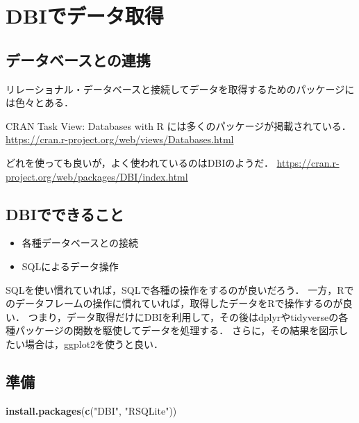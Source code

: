 \documentclass[
]{article}
\newenvironment{Shaded}{\begin{snugshade}}{\end{snugshade}}
\newcommand{\FunctionTok}[1]{\textcolor[rgb]{0.13,0.29,0.53}{\textbf{#1}}}
\newcommand{\NormalTok}[1]{#1}
\newcommand{\StringTok}[1]{\textcolor[rgb]{0.31,0.60,0.02}{#1}}
\providecommand{\tightlist}{%
  \setlength{\itemsep}{0pt}\setlength{\parskip}{0pt}}
\begin{document}
\hypertarget{dbi}{%
\section{DBIでデータ取得}\label{dbi}}

\hypertarget{ux30c7ux30fcux30bfux30d9ux30fcux30b9ux3068ux306eux9023ux643a}{%
\subsection{データベースとの連携}\label{ux30c7ux30fcux30bfux30d9ux30fcux30b9ux3068ux306eux9023ux643a}}

リレーショナル・データベースと接続してデータを取得するためのパッケージには色々とある．

CRAN Task View: Databases with R には多くのパッケージが掲載されている．
\url{https://cran.r-project.org/web/views/Databases.html}

どれを使っても良いが，よく使われているのはDBIのようだ．
\url{https://cran.r-project.org/web/packages/DBI/index.html}

\hypertarget{dbiux3067ux3067ux304dux308bux3053ux3068}{%
\subsection{DBIでできること}\label{dbiux3067ux3067ux304dux308bux3053ux3068}}

\begin{itemize}
\tightlist
\item
  各種データベースとの接続\\
\item
  SQLによるデータ操作
\end{itemize}

SQLを使い慣れていれば，SQLで各種の操作をするのが良いだろう．
一方，Rでのデータフレームの操作に慣れていれば，取得したデータをRで操作するのが良い．
つまり，データ取得だけにDBIを利用して，その後はdplyrやtidyverseの各種パッケージの関数を駆使してデータを処理する．
さらに，その結果を図示したい場合は，ggplot2を使うと良い．

\hypertarget{ux6e96ux5099-13}{%
\subsection{準備}\label{ux6e96ux5099-13}}

\begin{Shaded}
\begin{Highlighting}[]
\FunctionTok{install.packages}\NormalTok{(}\FunctionTok{c}\NormalTok{(}\StringTok{"DBI"}\NormalTok{, }\StringTok{"RSQLite"}\NormalTok{))}
\end{Highlighting}
\end{Shaded}
\end{document}
